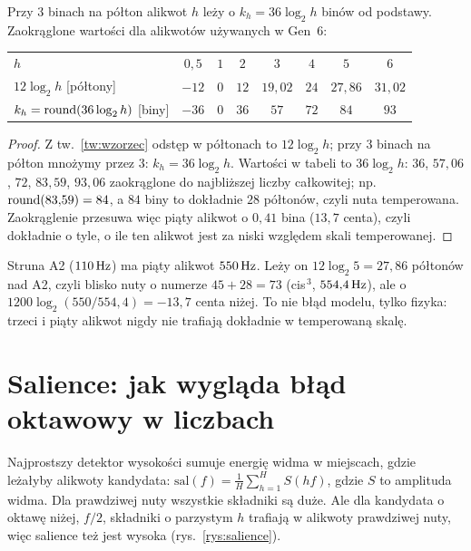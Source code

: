 \begin{wniosek}\label{wn:biny}
Przy $3$ binach na półton alikwot $h$ leży o $k_h=36\log_2 h$ binów od podstawy. Zaokrąglone wartości dla
alikwotów używanych w Gen~6:
\begin{center}\small
\begin{tabular}{@{}lccccccc@{}}
\toprule
$h$ & $0{,}5$ & $1$ & $2$ & $3$ & $4$ & $5$ & $6$\\
$12\log_2h$ [półtony] & $-12$ & $0$ & $12$ & $19{,}02$ & $24$ & $27{,}86$ & $31{,}02$\\
$k_h=\operatorname{round}(36\log_2h)$ [biny] & $-36$ & $0$ & $36$ & $57$ & $72$ & $84$ & $93$\\
\bottomrule
\end{tabular}
\end{center}
\end{wniosek}
\begin{proof}
Z tw.~\ref{tw:wzorzec} odstęp w półtonach to $12\log_2h$; przy $3$ binach na półton mnożymy przez $3$:
$k_h=36\log_2h$. Wartości w tabeli to $36\log_2 h$: $36$, $57{,}06$, $72$, $83{,}59$, $93{,}06$ zaokrąglone do
najbliższej liczby całkowitej; np.\ $\operatorname{round}(83{,}59)=84$, a $84$ biny to dokładnie $28$ półtonów, czyli nuta temperowana.
Zaokrąglenie przesuwa więc piąty alikwot o $0{,}41$ bina ($13{,}7$ centa), czyli dokładnie o tyle, o ile ten alikwot
jest za niski względem skali temperowanej.
\end{proof}

\begin{naliczbach}
Struna A2 ($110\,\mathrm{Hz}$) ma piąty alikwot $550\,\mathrm{Hz}$. Leży on $12\log_2 5=27{,}86$ półtonów nad A2, czyli blisko nuty
o numerze $45+28=73$ (cis$^{\,3}$, $554{,}4\,\mathrm{Hz}$), ale o $1200\log_2(550/554{,}4)=-13{,}7$ centa niżej. To nie
błąd modelu, tylko fizyka: trzeci i piąty alikwot nigdy nie trafiają dokładnie w temperowaną skalę.
\end{naliczbach}

\section{Salience: jak wygląda błąd oktawowy w liczbach}

Najprostszy detektor wysokości sumuje energię widma w miejscach, gdzie leżałyby alikwoty kandydata:
$\mathrm{sal}(f)=\frac1H\sum_{h=1}^{H}S(hf)$, gdzie $S$ to amplituda widma. Dla prawdziwej nuty wszystkie składniki są duże.
Ale dla kandydata o oktawę niżej, $f/2$, składniki o parzystym $h$ trafiają w alikwoty prawdziwej nuty, więc salience
też jest wysoka (rys.~\ref{rys:salience}).

